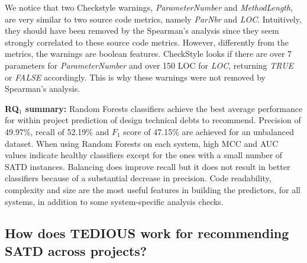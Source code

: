 We notice that two Checkstyle warnings, \textit{ParameterNumber} and \textit{MethodLength}, are very similar to two source code metrics, namely \textit{ParNbr} and \textit{LOC}. Intuitively, they should have been removed by the Spearman's analysis since they seem strongly correlated to these source code metrics. However, differently from the metrics, the warnings are boolean features. CheckStyle looks if there are over 7 parameters for \textit{ParameterNumber} and over 150 LOC for \textit{LOC}, returning \textit{TRUE} or \textit{FALSE} accordingly. This is why these warnings were not removed by Spearman's analysis.

\begin{mdframed}
	{\bf RQ$_1$ summary:} Random Forests classifiers achieve the best average performance for within project prediction of design technical debts to recommend. Precision of 49.97\%, recall of 52.19\% and $F_1$ score of 47.15\% are achieved for an unbalanced dataset. When using Random Forests on each system, high MCC and AUC values indicate healthy classifiers except for the ones with a small number of SATD instances. Balancing does improve recall but it does not result in better classifiers because of a substantial decrease in precision. Code readability, complexity and size are the most useful features in building the predictors, for all systems, in addition to some system-specific analysis checks.
\end{mdframed}

\subsection{How does TEDIOUS work for recommending SATD across projects?}



